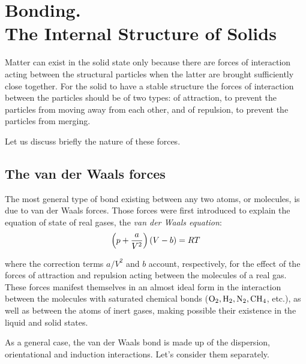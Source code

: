 

\chapter[Bonding. The Internal Structure of Solids]{Bonding.\\The Internal Structure of Solids}\label{chap:1}

Matter can exist in the solid state only because there are forces of interaction acting between the structural particles when the latter are brought sufficiently close together. For the solid to have a stable structure the forces of interaction between the particles should be of two types: of attraction, to prevent the particles from moving away from each other, and of repulsion, to prevent the particles from merging.

Let us discuss briefly the nature of these forces.

\section{The van der Waals forces}\label{sec:1}

The most general type of bond existing between any two atoms, or molecules, is due to van der Waals forces. Those forces were first introduced to explain the equation of state of real gases, the \textit{van der Waals equation}:
\begin{equation}\label{eq:1_1}
	\left(p + \frac{a}{V^2}\right)(V - b) = RT
\end{equation}

\noindent
where the correction terms $a/V^2$ and $b$ account, respectively, for the effect of the forces of attraction and repulsion acting between the molecules of a real gas. These forces manifest themselves in an almost ideal form in the interaction between the molecules with saturated chemical bonds ($\ce{O2}, \ce{H2}, \ce{N2}, \ce{CH4}$, etc.), as well as between the atoms of inert gases, making possible their existence in the liquid and solid states.

As a general case, the van der Waals bond is made up of the dispersion, orientational and induction interactions. Let's consider them separately.

